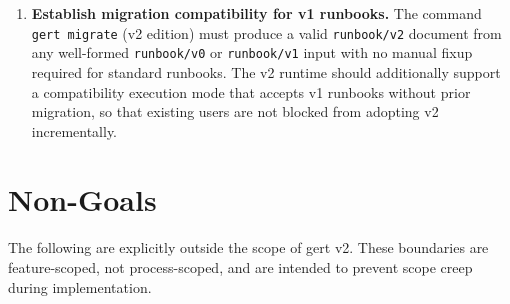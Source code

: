 \begin{enumerate}[label=\textbf{G\arabic*.}]
  \item \textbf{Establish migration compatibility for v1 runbooks.}
    The command \texttt{gert migrate} (v2 edition) must produce a valid \texttt{runbook/v2} document
    from any well-formed \texttt{runbook/v0} or \texttt{runbook/v1} input with no manual fixup
    required for standard runbooks. The v2 runtime should additionally support a compatibility
    execution mode that accepts v1 runbooks without prior migration, so that existing users are not
    blocked from adopting v2 incrementally.

\end{enumerate}

\section{Non-Goals}

The following are explicitly outside the scope of gert v2. These boundaries are feature-scoped, not
process-scoped, and are intended to prevent scope creep during implementation.

